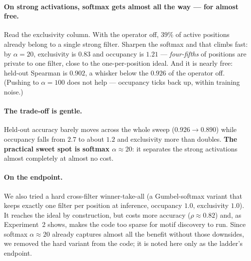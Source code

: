 \paragraph{On strong activations, softmax gets almost all the way --- for almost free.} Read the
exclusivity column. With the operator off, $39\%$ of active positions already belong to a single
strong filter. Sharpen the softmax and that climbs fast: by $\alpha=20$, exclusivity is $0.83$ and
occupancy is $1.21$ --- \emph{four-fifths} of positions are private to one filter, close to the
one-per-position ideal. And it is nearly free: held-out Spearman is $0.902$, a whisker below the
$0.926$ of the operator off. (Pushing to $\alpha=100$ does not help --- occupancy ticks back up,
within training noise.)

\paragraph{The trade-off is gentle.} Held-out accuracy barely moves across the whole sweep
($0.926 \to 0.890$) while occupancy falls from $2.7$ to about $1.2$ and exclusivity more than
doubles. \textbf{The practical sweet spot is softmax $\alpha\approx20$}: it separates the strong
activations almost completely at almost no cost.

\paragraph{On the endpoint.} We also tried a hard cross-filter winner-take-all (a Gumbel-softmax
variant that keeps exactly one filter per position at inference, occupancy $1.0$, exclusivity
$1.0$). It reaches the ideal by construction, but costs more accuracy ($\rho\approx0.82$) and, as
Experiment~2 shows, makes the code too sparse for motif discovery to run. Since softmax
$\alpha\approx20$ already captures almost all the benefit without those downsides, we removed the
hard variant from the code; it is noted here only as the ladder's endpoint.
